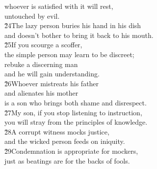 \begin{poetry}
\poemll    whoever is satisfied with it will rest, \\
\poemlll       untouched by evil. \\
\poeml \v{24}The lazy person buries his hand in his dish \\
\poemll    and doesn't bother to bring it back to his mouth. \\
\poeml \v{25}If you scourge a scoffer, \\
\poemll    the simple person may learn to be discreet; \\
\poeml rebuke a discerning man \\
\poemll    and he will gain understanding. \\
\poeml \v{26}Whoever mistreats his father \\
\poemll    and alienates his mother \\
\poemlll       is a son who brings both shame and disrespect. \\
\poeml \v{27}My son, if you stop listening to instruction, \\
\poemll    you will stray from the principles of knowledge. \\
\poeml \v{28}A corrupt witness mocks justice, \\
\poemll    and the wicked person feeds on iniquity. \\
\poeml \v{29}Condemnation is appropriate for mockers, \\
\poemll    just as beatings are for the backs of fools.
\end{poetry}

